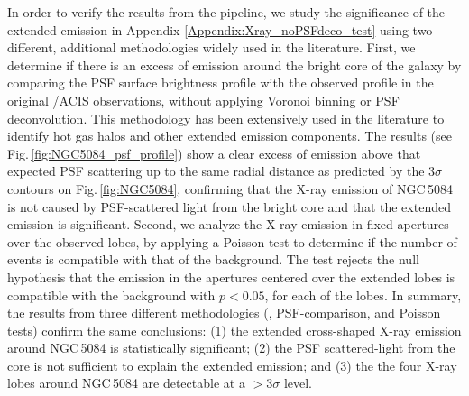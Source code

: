 \documentclass[modern]{CORE-AAS/aastex631}
\begin{document}
In order to verify the results from the pipeline, we study the significance of the extended emission in Appendix \ref{Appendix:Xray_noPSFdeco_test} using two different, additional methodologies widely used in the literature. First, we determine if there is an excess of emission around the bright core of the galaxy by comparing the PSF surface brightness profile with the observed profile in the original \Chandra/ACIS observations, without applying Voronoi binning or PSF deconvolution. This methodology has been extensively used in the literature \citep{fabbiano+2017apj842_4,fabbiano+2018apj855_131, jones+2020apj891_133,ma+2020apj900_164,ma+2023apj948_61} to identify hot gas halos and other extended emission components. The results (see Fig.\,\ref{fig:NGC5084_psf_profile}) show a clear excess of emission above that expected PSF scattering up to the same radial distance as predicted by the $3\sigma$ contours on Fig.\,\ref{fig:NGC5084}, confirming that the X-ray emission of NGC\,5084 is not caused by PSF-scattered light from the bright core and that the extended emission is significant.
Second, we analyze the X-ray emission in fixed apertures over the observed lobes, by applying a Poisson test \citep{KRISHNAMOORTHY200423} to determine if the number of events is compatible with that of the background. The test rejects the null hypothesis that the emission in the apertures centered over the extended lobes is compatible with the background with $p<0.05$, for each of the lobes.
In summary, the results from three different methodologies (\SAUNAS, PSF-comparison, and Poisson tests) confirm the same conclusions: (1) the extended cross-shaped X-ray emission around NGC\,5084 is statistically significant; (2) the PSF scattered-light from the core is not sufficient to explain the extended emission; and (3) the the four X-ray lobes around NGC\,5084 are detectable at a $>3\sigma$ level.
\end{document}
